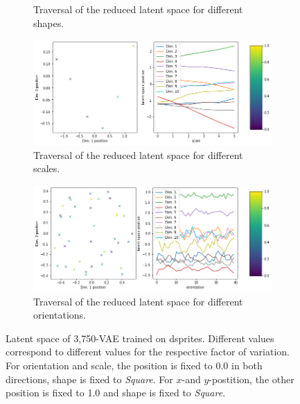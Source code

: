 \begin{figure}[H]
\begin{subfigure}{.48\textwidth}
        \caption{Traversal of the reduced latent space for different shapes.}
    \end{subfigure}
    \begin{subfigure}{.48\textwidth}
        \includegraphics[width=\textwidth]{images/latent_space_traversals/vae_3750_dsprites_latent_space_values_scale.png}
        \caption{Traversal of the reduced latent space for different scales.}
    \end{subfigure}
    \begin{subfigure}{.48\textwidth}
        \includegraphics[width=\textwidth]{images/latent_space_traversals/vae_3750_dsprites_latent_space_values_orientation.png}
        \caption{Traversal of the reduced latent space for different orientations.}
    \end{subfigure}
    \caption[\ac{VAE} on dsprites: Latent Space Values]{Latent space of 3,750-\ac{VAE} trained on dsprites. Different values correspond to different values for the respective factor of variation. For orientation and scale, the position is fixed to 0.0 in both directions, shape is fixed to \textit{Square}. For $x$-and $y$-postition, the other position is fixed to 1.0 and shape is fixed to \textit{Square}.}
    \label{fig:vae_dsprite_3750_latent_space_position}
\end{figure}

